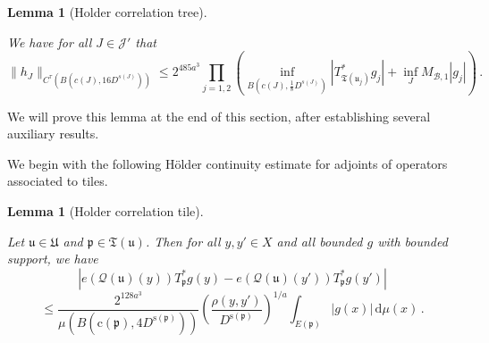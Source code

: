 \documentclass[10pt,a4paper]{article}
\theoremstyle{plain}
\newtheorem{lemma}[theorem]{Lemma}
\theoremstyle{definition}
\numberwithin{equation}{subsection}
\newcommand{\fp}{{\mathfrak p}}
\newcommand{\fu}{{\mathfrak u}}
\newcommand{\fU}{{\mathfrak U}}
\newcommand{\fT}{{\mathfrak T}}
\newcommand{\pc}{{\mathrm{c}}}
\newcommand{\ps}{{\mathrm{s}}}
\newcommand{\fcc}{{\mathcal{Q}}}
\newcommand{\lean}[1]{}
\newcommand{\uses}[1]{}
\newcommand{\leanok}{}
\begin{document}
    \begin{lemma}[Holder correlation tree]
        \label{Holder-correlation-tree}
        \leanok
        \lean{TileStructure.Forest.holder_correlation_tree}
        \uses{global-tree-control-2}
        We have for all $J \in \mathcal{J}'$ that
      \begin{equation}
            \label{hHolder}
            \|h_J\|_{C^{\tau}(B(c(J), 16D^{s(J)}))} \le 2^{485a^3} \prod_{j = 1,2} (\inf_{B(c(J), \frac{1}{8}D^{s(J)})} |T_{\fT(\fu_j)}^* g_j| + \inf_J M_{\mathcal{B}, 1} |g_j|)\,.
        \end{equation}
    \end{lemma}

    We will prove this lemma at the end of this section, after establishing several auxiliary results.

    We begin with the following H\"older continuity estimate for adjoints of operators associated to tiles.
    \begin{lemma}[Holder correlation tile]
        \label{Holder-correlation-tile}
        \leanok
        \lean{TileStructure.Forest.holder_correlation_tile}
        \uses{adjoint-tile-support}
        Let $\fu \in \fU$ and $\fp \in \fT(\fu)$. Then for all $y, y' \in X$ and all bounded $g$ with bounded support, we have
        $$
            |e(\fcc(\fu)(y)) T_{\fp}^* g(y) - e(\fcc(\fu)(y')) T_{\fp}^* g(y')|
        $$
      \begin{equation}
            \label{T*Holder2}
            \le \frac{2^{128a^3}}{\mu(B(\pc(\fp), 4D^{\ps(\fp)}))} \left(\frac{\rho(y, y')}{D^{\ps(\fp)}}\right)^{1/a} \int_{E(\fp)} |g(x)| \, \mathrm{d}\mu(x)\,.
        \end{equation}
    \end{lemma}
\end{document}
